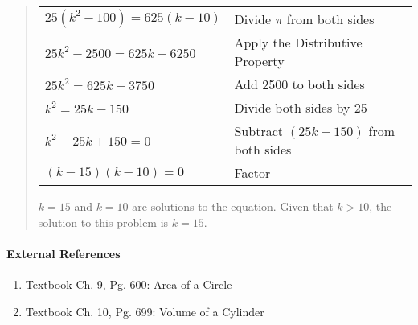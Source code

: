 \documentclass[letterpaper,12pt,twoside]{report}
\begin{document}
\begin{quotation}
		\begin{center}
			\begin{tabular}{l | l}
				$25(k^2-100)=625(k-10)$ & Divide $\pi$ from both sides \\
				$25k^2-2500=625k-6250$ & Apply the Distributive Property \\
				$25k^2=625k-3750$ & Add 2500 to both sides \\
				$k^2=25k-150$ & Divide both sides by 25 \\
				$k^2-25k+150=0$ & Subtract $(25k-150)$ from both sides \\
				$(k-15)(k-10)=0$ & Factor
			\end{tabular}
		\end{center}
		
		$k=15$ and $k=10$ are solutions to the equation. Given that $k>10$, the solution to this problem is $\boxed{k=15}$.
	\end{quotation}
	
	\paragraph{External References}
	
	\begin{enumerate}
		\item Textbook Ch. 9, Pg. 600: Area of a Circle
		\item Textbook Ch. 10, Pg. 699: Volume of a Cylinder
		
	\end{enumerate}
	
\end{document}
